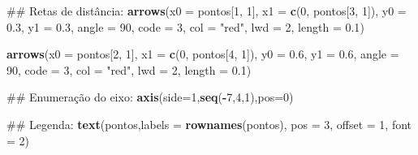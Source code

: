 \documentclass[]{book}
\newenvironment{Shaded}{\begin{snugshade}}{\end{snugshade}}
\newcommand{\KeywordTok}[1]{\textcolor[rgb]{0.13,0.29,0.53}{\textbf{#1}}}
\newcommand{\DataTypeTok}[1]{\textcolor[rgb]{0.13,0.29,0.53}{#1}}
\newcommand{\DecValTok}[1]{\textcolor[rgb]{0.00,0.00,0.81}{#1}}
\newcommand{\FloatTok}[1]{\textcolor[rgb]{0.00,0.00,0.81}{#1}}
\newcommand{\StringTok}[1]{\textcolor[rgb]{0.31,0.60,0.02}{#1}}
\newcommand{\OperatorTok}[1]{\textcolor[rgb]{0.81,0.36,0.00}{\textbf{#1}}}
\newcommand{\NormalTok}[1]{#1}
\begin{document}
\begin{Shaded}
\begin{Highlighting}[]
\NormalTok{## Retas de distância:}
\KeywordTok{arrows}\NormalTok{(}\DataTypeTok{x0 =}\NormalTok{ pontos[}\DecValTok{1}\NormalTok{, }\DecValTok{1}\NormalTok{], }\DataTypeTok{x1 =} \KeywordTok{c}\NormalTok{(}\DecValTok{0}\NormalTok{, pontos[}\DecValTok{3}\NormalTok{, }\DecValTok{1}\NormalTok{]),}
       \DataTypeTok{y0 =} \FloatTok{0.3}\NormalTok{, }\DataTypeTok{y1 =} \FloatTok{0.3}\NormalTok{,}
       \DataTypeTok{angle =} \DecValTok{90}\NormalTok{, }\DataTypeTok{code =} \DecValTok{3}\NormalTok{, }\DataTypeTok{col =} \StringTok{"red"}\NormalTok{, }\DataTypeTok{lwd =} \DecValTok{2}\NormalTok{, }\DataTypeTok{length =} \FloatTok{0.1}\NormalTok{)}

\KeywordTok{arrows}\NormalTok{(}\DataTypeTok{x0 =}\NormalTok{ pontos[}\DecValTok{2}\NormalTok{, }\DecValTok{1}\NormalTok{], }\DataTypeTok{x1 =} \KeywordTok{c}\NormalTok{(}\DecValTok{0}\NormalTok{, pontos[}\DecValTok{4}\NormalTok{, }\DecValTok{1}\NormalTok{]),}
       \DataTypeTok{y0 =} \FloatTok{0.6}\NormalTok{, }\DataTypeTok{y1 =} \FloatTok{0.6}\NormalTok{,}
       \DataTypeTok{angle =} \DecValTok{90}\NormalTok{, }\DataTypeTok{code =} \DecValTok{3}\NormalTok{, }\DataTypeTok{col =} \StringTok{"red"}\NormalTok{, }\DataTypeTok{lwd =} \DecValTok{2}\NormalTok{, }\DataTypeTok{length =} \FloatTok{0.1}\NormalTok{)}

\NormalTok{## Enumeração do eixo:}
\KeywordTok{axis}\NormalTok{(}\DataTypeTok{side=}\DecValTok{1}\NormalTok{,}\KeywordTok{seq}\NormalTok{(}\OperatorTok{-}\DecValTok{7}\NormalTok{,}\DecValTok{4}\NormalTok{,}\DecValTok{1}\NormalTok{),}\DataTypeTok{pos=}\DecValTok{0}\NormalTok{)}

\NormalTok{## Legenda:}
\KeywordTok{text}\NormalTok{(pontos,}\DataTypeTok{labels =} \KeywordTok{rownames}\NormalTok{(pontos), }\DataTypeTok{pos =} \DecValTok{3}\NormalTok{, }\DataTypeTok{offset =} \DecValTok{1}\NormalTok{, }\DataTypeTok{font =} \DecValTok{2}\NormalTok{)}


\end{Highlighting}
\end{Shaded}
\end{document}
